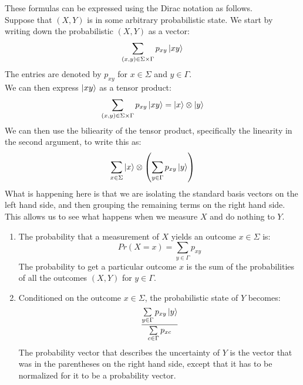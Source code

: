 \documentclass{report}
\begin{document}
\raggedright
These formulas can be expressed using the Dirac notation as follows. \\[1em]
Suppose that $(X,Y)$ is in some arbitrary probabilistic state. We start by writing down the probabilistic $(X,Y)$ as a vector:
\begin{equation*}
    \sum\limits_{(x,y)\in\Sigma\times\Gamma}p_{xy}\ket{xy}
\end{equation*}
The entries are denoted by $p_{xy}$ for $x\in\Sigma$ and $y\in\Gamma$.\\[1em]
We can then express $\ket{xy}$ as a tensor product:
\begin{equation*}
    \sum\limits_{(x,y)\in\Sigma\times\Gamma}p_{xy}\ket{xy}=\ket{x}\otimes\ket{y}
\end{equation*}
We can then use the biliearity of the tensor product, specifically the linearity in the second argument, to write this as:
\begin{equation*}
    \sum\limits_{x\in\Sigma}\ket{x}\otimes\left(\sum\limits_{y\in\Gamma}p_{xy}\ket{y}\right)
\end{equation*}
What is happening here is that we are isolating the standard basis vectors on the left hand side, and then grouping the remaining terms on the right hand side. This allows us to see what happens when we measure $X$ and do nothing to $Y$.
\begin{enumerate}
    \item The probability that a measurement of $X$ yields an outcome $x\in\Sigma$ is:
    \begin{equation*}
        Pr(X=x)=\sum\limits_{y\in\Gamma}p_{xy}
    \end{equation*}
    The probability to get a particular outcome $x$ is the sum of the probabilities of all the outcomes $(X,Y)$ for $y\in\Gamma$.
    \item Conditioned on the outcome $x\in\Sigma$, the probabilistic state of $Y$ becomes:
    \begin{equation*}
        \dfrac{\sum\limits_{y\in\Gamma}p_{xy}\ket{y}}{\sum\limits_{c\in\Gamma}p_{xc}}
    \end{equation*}
    The probability vector that describes the uncertainty of $Y$ is the vector that was in the parentheses on the right hand side, except that it has to be normalized for it to be a probability vector.
\end{enumerate}

\newpage
\end{document}
